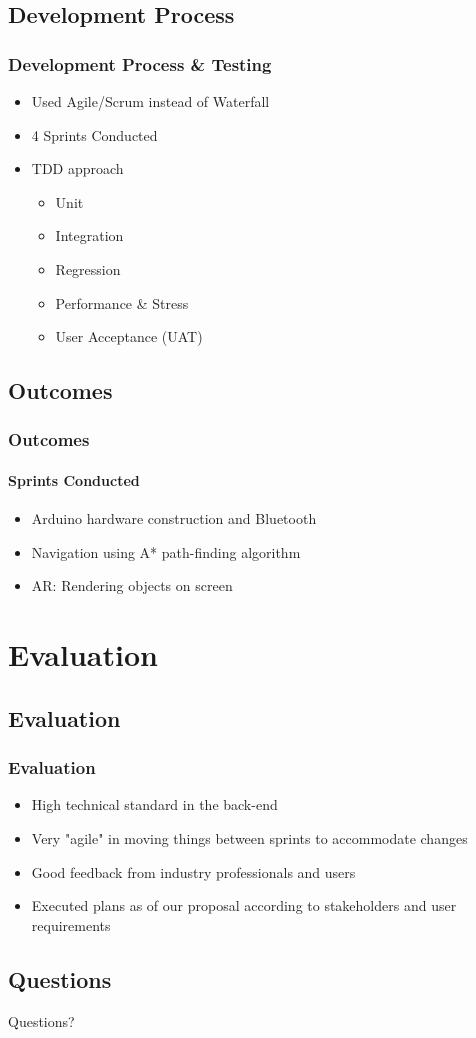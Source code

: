 \documentclass[compress]{beamer}
\begin{document}
	\subsection{Development Process}
	\begin{frame}
	    \frametitle{Development Process \& Testing}
		\begin{itemize}
			\item Used Agile/Scrum instead of Waterfall
			\vfill
			\item 4 Sprints Conducted
			\vfill
			\item TDD approach
			\begin{itemize}
				\item Unit
				\item Integration
				\item Regression
				\item Performance \& Stress
				\item User Acceptance (UAT)
			\end{itemize}
		\end{itemize}
	\end{frame}

	\subsection{Outcomes}
	\begin{frame}
		\frametitle{Outcomes}

		\framesubtitle{Sprints Conducted}
		\begin{itemize}
			\item Arduino hardware construction and Bluetooth
			\vfill
			\item Navigation using A* path-finding algorithm
			\vfill
			\item AR: Rendering objects on screen
		\end{itemize}
	\end{frame}

	\section{Evaluation}
	\subsection{Evaluation}
		\begin{frame}
			\frametitle{Evaluation}
			\begin{itemize}
				\item High technical standard in the back-end
				\vfill
				\item Very "agile" in moving things between sprints to accommodate changes
				\vfill
				\item Good feedback from industry professionals and users
				\vfill
				\item Executed plans as of our proposal according to stakeholders and user requirements
			\end{itemize}
		\end{frame}

	\subsection{Questions}
	\begin{frame}
		\begin{center}
			\Huge Questions?
		\end{center}
	\end{frame}
\end{document}
